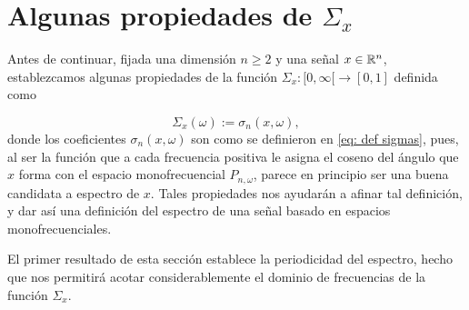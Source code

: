 \section{Algunas propiedades de $\Sigma_{x}$}

Antes de continuar, 
fijada una dimensión $n \geq 2$ y una 
señal $x \in \mathbb{R}^{n}$,
establezcamos algunas propiedades de la función
$\Sigma_{x}: [0, \infty[ \longrightarrow [0,1]$ definida como

\begin{equation}
\label{eq: estudiando espectro}
\Sigma_{x}(\omega) := \sigma_{n}(x, \omega),
\end{equation}
donde los coeficientes $\sigma_{n}(x, \omega)$
son como se definieron en 
\eqref{eq: def sigmas}, 
pues, al ser la función que a cada
frecuencia positiva le asigna el coseno del 
ángulo que $x$ forma con el espacio monofrecuencial
$P_{n, \omega}$, parece en principio ser una buena candidata
a espectro de $x$. Tales propiedades nos ayudarán a afinar tal
definición, y dar así una definición del espectro
de una señal basado en espacios monofrecuenciales.


El primer resultado de esta sección establece
la periodicidad del espectro, hecho que
nos permitirá
acotar considerablemente el dominio de frecuencias
de la función $\Sigma_{x}$.

